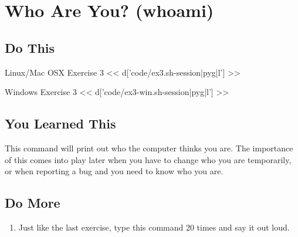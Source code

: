 \chapter{Who Are You? (whoami)}

\section{Do This}

\begin{code}{Linux/Mac OSX Exercise 3}
<< d['code/ex3.sh-session|pyg|l'] >>
\end{code}

\begin{code}{Windows Exercise 3}
<< d['code/ex3-win.sh-session|pyg|l'] >>
\end{code}

\section{You Learned This}

This command will print out who the computer thinks you are.  The importance
of this comes into play later when you have to change who you are temporarily,
or when reporting a bug and you need to know who you are.

\section{Do More}

\begin{enumerate}
\item Just like the last exercise, type this command 20 times and say it out loud.
\end{enumerate}

